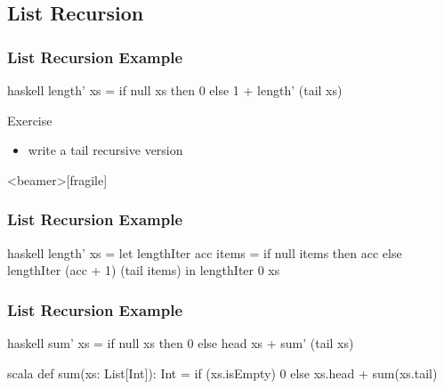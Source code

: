 \documentclass[dvipsnames]{beamer}
\theoremstyle{plain}
\begin{document}
\subsection{List Recursion}

\begin{frame}[fragile]
  \frametitle{List Recursion Example}

  \begin{example}
    \begin{pygments}{haskell}
length' xs =
    if null xs
    then 0
    else 1 + length' (tail xs)
    \end{pygments}
  \end{example}

  \pause
  \begin{block}{Exercise}
    \begin{itemize}
      \item write a tail recursive version
    \end{itemize}
  \end{block}
\end{frame}

\begin{frame}<beamer>[fragile]
  \frametitle{List Recursion Example}

  \begin{example}
    \begin{pygments}{haskell}
length' xs =
    let
        lengthIter acc items =
            if null items
            then acc
            else lengthIter (acc + 1) (tail items)
    in
        lengthIter 0 xs
    \end{pygments}
  \end{example}
\end{frame}

\begin{frame}[fragile]
  \frametitle{List Recursion Example}
  \begin{example}
    \pause
    \begin{pygments}{haskell}
sum' xs =
    if null xs
    then 0
    else head xs + sum' (tail xs)
    \end{pygments}
  \end{example}

  \pause
  \begin{example}[Scala]
    \begin{pygments}{scala}
def sum(xs: List[Int]): Int =
    if (xs.isEmpty) 0
    else xs.head + sum(xs.tail)
    \end{pygments}
  \end{example}
\end{frame}
\end{document}
